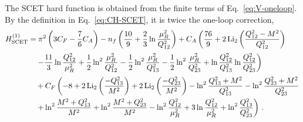 The SCET hard function is obtained from the finite terms of
Eq.~\eqref{eq:V-oneloop}. By the definition in Eq.~\eqref{eq:CH-SCET},
it is twice the one-loop correction,
\begin{equation}
\label{eq:H1-SCET}
\begin{aligned}
& H^{(1)}_{\rm SCET}=\pi^2\left(
3C_F-\frac{7}{6}C_A\right)-n_f\left(\frac{10}{9}+\frac{2}{3}\ln\frac{\mu_R^2}{Q_{12}^2}\right)+C_A\left(\frac{76}{9}
+2\operatorname{Li}_2\left(\frac{Q_{12}^2-M^2}{Q_{12}^2}
\right)\right.\\[0.5ex]
& \qquad\qquad\left.-\frac{11}{3}\ln\frac{Q_{12}^2}{\mu_R^2}
+\frac{1}{2}\ln^2\frac{\mu_R^2}{Q_{12}^2}
-\frac{1}{2}\ln^2\frac{\mu_R^2}{Q_{13}^2}
-\frac{1}{2}\ln^2\frac{\mu_R^2}{Q_{23}^2}+\ln\frac{Q_{12}^2}{Q_{13}^2}
 \ln\frac{Q_{12}^2}{Q_{23}^2}
\right)\\[0.5ex]
&\qquad\qquad+C_F\left(-8
+2\operatorname{Li}_2\left(\frac{-Q_{13}^2}{M^2}\right)
+2\operatorname{Li}_2\left(\frac{-Q_{23}^2}{M^2}\right)
-\ln^2\frac{Q_{13}^2+M^2}{Q_{13}^2}
-\ln^2\frac{Q_{23}^2+M^2}{Q_{23}^2}\right.\\
&\qquad\qquad\left.
+\ln^2\frac{M^2+Q_{13}^2}{M^2}
+\ln^2\frac{M^2+Q_{23}^2}{M^2}
-\ln^2\frac{Q_{12}^2}{\mu_R^2}
+3\ln\frac{Q_{12}^2}{\mu_R^2}
+\ln^2\frac{Q_{13}^2}{Q_{23}^2}
\right)\,.
\end{aligned}
\end{equation}

